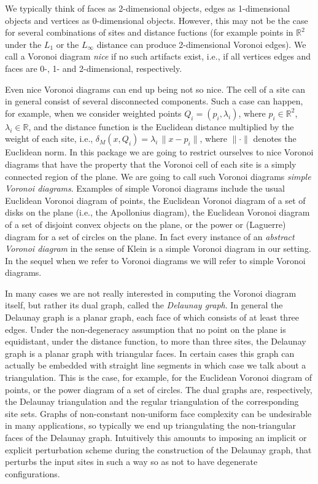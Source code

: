 We typically think of faces as 2-dimensional objects, edges as
1-dimensional objects and vertices as 0-dimensional objects. However,
this may not be the case for several combinations of sites and
distance fuctions (for example points in $\mathbb{R}^2$ under the
$L_1$ or the $L_\infty$ distance can produce 2-dimensional Voronoi
edges). We call a Voronoi diagram \emph{nice} if no such artifacts
exist, i.e., if all vertices edges and faces are 0-, 1- and
2-dimensional, respectively.

Even nice Voronoi diagrams can end up being not so nice. The cell of a
site can in general consist of several disconnected components. Such a
case can happen, for example, when we consider weighted points
$Q_i=(p_i,\lambda_i)$, where $p_i\in\mathbb{R}^2$,
$\lambda_i\in\mathbb{R}$, and the distance function is 
the Euclidean distance multiplied by the weight of each site, i.e.,
$\delta_M(x,Q_i)=\lambda_i\,\|x-p_i\|$, where $\|\cdot\|$ denotes the
Euclidean norm. In this package we are going to restrict ourselves to
nice Voronoi diagrams that have the property that the Voronoi cell of
each site is a simply connected region of the plane. We are going to
call such Voronoi diagrams \emph{simple Voronoi diagrams}. Examples of
simple Voronoi diagrams include the usual Euclidean Voronoi diagram of
points, the Euclidean Voronoi diagram of a set of disks on the plane
(i.e., the Apollonius diagram), the Euclidean Voronoi diagram of a set
of disjoint convex objects on the plane, or the power or (Laguerre)
diagram for a set of circles on the plane. In fact every instance of
an \emph{abstract Voronoi diagram} in the sense of Klein \cite{k-cavd-89} 
is a simple Voronoi diagram in our setting. In the sequel when we
refer to Voronoi diagrams we will refer to simple Voronoi diagrams.

In many cases we are not really interested in computing the
Voronoi diagram itself, but rather its dual graph, called the
\emph{Delaunay graph}. In general the Delaunay graph is a planar
graph, each face of which consists of at least three edges.
Under the non-degeneracy assumption that no point on the plane is
equidistant, under the distance function, to more than three sites, 
the Delaunay graph is a planar graph with triangular faces.
In certain cases this graph can actually be embedded with straight
line segments in which case we talk about a triangulation. This is the
case, for example, for the Euclidean Voronoi diagram of points, or the
power diagram of a set of circles. The dual graphs are, respectively,
the Delaunay triangulation and the regular triangulation of the
corresponding site sets. Graphs of non-constant non-uniform face
complexity can be undesirable in many applications, so typically we
end up triangulating the non-triangular faces of the Delaunay
graph. Intuitively this amounts to imposing an implicit or explicit
perturbation scheme during the construction of the Delaunay graph,
that perturbs the input sites in such a way so as not to have
degenerate configurations.

